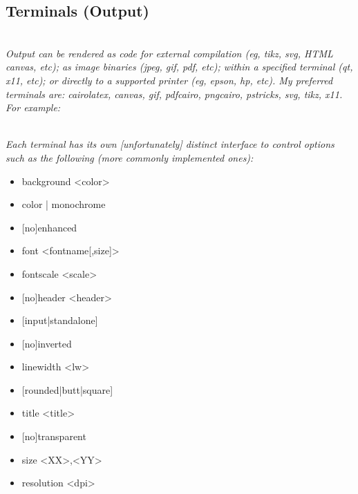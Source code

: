 \subsection*{Terminals (Output)}

\\

\textit{Output can be rendered as code for external compilation (eg, tikz, svg, HTML canvas, etc); as image binaries (jpeg, gif, pdf, etc); within a specified terminal (qt, x11, etc); or directly to a supported printer (eg, epson, hp, etc). My preferred terminals are: cairolatex, canvas, gif, pdfcairo, pngcairo, pstricks, svg, tikz, x11. For example:}

\\

\textit{Each terminal has its own [unfortunately] distinct interface to control options such as the following (more commonly implemented ones):}\\

\begin{itemize}
    \item background <color>
    \item color | monochrome
    \item {[no]}enhanced
    \item font <fontname[,size]>
    \item fontscale <scale>
    \item {[no]}header <header>
    \item {[input|standalone]}
    \item {[no]}inverted
    \item linewidth <lw>
    \item {[rounded|butt|square]}
    \item title <title>
    \item {[no]}transparent
    \item size <XX>,<YY>
    \item resolution <dpi>
\end{itemize}


